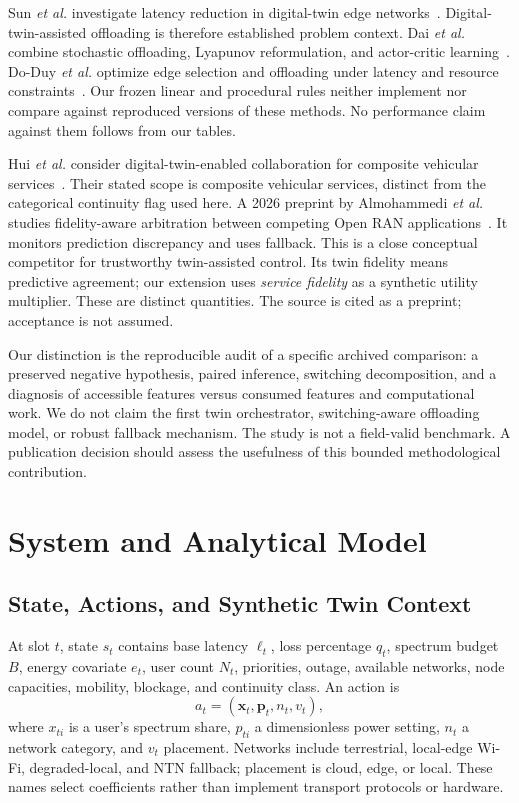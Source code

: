 \documentclass[letterpaper,journal]{IEEEtran}
\begin{document}
Sun \emph{et al.} investigate latency reduction in digital-twin edge networks~\cite{sun2020latency}. Digital-twin-assisted offloading is therefore established problem context. Dai \emph{et al.} combine stochastic offloading, Lyapunov reformulation, and actor-critic learning~\cite{dai2021stochastic}. Do-Duy \emph{et al.} optimize edge selection and offloading under latency and resource constraints~\cite{doduy2022offloading}. Our frozen linear and procedural rules neither implement nor compare against reproduced versions of these methods. No performance claim against them follows from our tables.

Hui \emph{et al.} consider digital-twin-enabled collaboration for composite vehicular services~\cite{hui2025collaboration}. Their stated scope is composite vehicular services, distinct from the categorical continuity flag used here. A 2026 preprint by Almohammedi \emph{et al.} studies fidelity-aware arbitration between competing Open RAN applications~\cite{almohammedi2026fidelity}. It monitors prediction discrepancy and uses fallback. This is a close conceptual competitor for trustworthy twin-assisted control. Its twin fidelity means predictive agreement; our extension uses \emph{service fidelity} as a synthetic utility multiplier. These are distinct quantities. The source is cited as a preprint; acceptance is not assumed.

Our distinction is the reproducible audit of a specific archived comparison: a preserved negative hypothesis, paired inference, switching decomposition, and a diagnosis of accessible features versus consumed features and computational work. We do not claim the first twin orchestrator, switching-aware offloading model, or robust fallback mechanism. The study is not a field-valid benchmark. A publication decision should assess the usefulness of this bounded methodological contribution.

\section{System and Analytical Model}
\subsection{State, Actions, and Synthetic Twin Context}
At slot $t$, state $s_t$ contains base latency $\ell_t$, loss percentage $q_t$, spectrum budget $B$, energy covariate $e_t$, user count $N_t$, priorities, outage, available networks, node capacities, mobility, blockage, and continuity class. An action is
\begin{equation}a_t=(\boldsymbol{x}_t,\boldsymbol{p}_t,n_t,v_t),\end{equation}
where $x_{ti}$ is a user's spectrum share, $p_{ti}$ a dimensionless power setting, $n_t$ a network category, and $v_t$ placement. Networks include terrestrial, local-edge Wi-Fi, degraded-local, and NTN fallback; placement is cloud, edge, or local. These names select coefficients rather than implement transport protocols or hardware.
\end{document}
